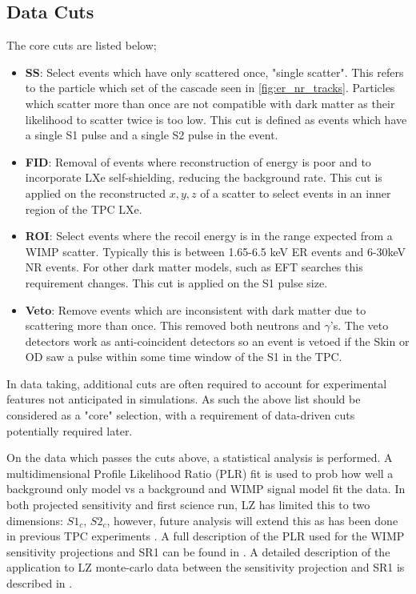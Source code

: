 \par
\subsection{Data Cuts}
\par
The core cuts are listed below;
\begin{itemize}
    \item \textbf{SS}: Select events which have only scattered once, "single scatter". This refers to the particle which set of the cascade seen in \autoref{fig:er_nr_tracks}. Particles which scatter more than once are not compatible with dark matter as their likelihood to scatter twice is too low. This cut is defined as events which have a single S1 pulse and a single S2 pulse in the event.
    \item \textbf{FID}: Removal of events where reconstruction of energy is poor and to incorporate LXe self-shielding, reducing the background rate. This cut is applied on the reconstructed {$x,y,z$} of a scatter to select events in an inner region of the TPC LXe.
    \item \textbf{ROI}: Select events where the recoil energy is in the range expected from a WIMP scatter. Typically this is between 1.65-6.5 keV ER events and 6-30keV NR events. For other dark matter models, such as EFT searches this requirement changes. This cut is applied on the S1 pulse size.
    \item \textbf{Veto}: Remove events which are inconsistent with dark matter due to scattering more than once. This removed both neutrons and $\gamma$'s. The veto detectors work as anti-coincident detectors so an event is vetoed if the Skin or OD saw a pulse within some time window of the S1 in the TPC.
\end{itemize}
In data taking, additional cuts are often required to account for experimental features not anticipated in simulations.
As such the above list should be considered as a "core" selection, with a requirement of data-driven cuts potentially required later.

\par
On the data which passes the cuts above, a statistical analysis is performed.
A multidimensional Profile Likelihood Ratio (PLR) fit is used to prob how well a background only model vs a background and WIMP signal model fit the data.
In both projected sensitivity and first science run, LZ has limited this to two dimensions: {$S1_c$, $S2_c$}, however, future analysis will extend this as has been done in previous TPC experiments \cite{LUX_RUN1_EFT_2021,LUX_RUN4_EFT_2021,shaunalsum_thesis_ref}.
A full description of the PLR used for the WIMP sensitivity projections and SR1 can be found in \cite{LZ_Ibles_LZStats_Thesis_ref}. 
A detailed description of the application to LZ monte-carlo data between the sensitivity projection and SR1 is described in \cite{jonathannikoleyczik_thesis_ref}.
